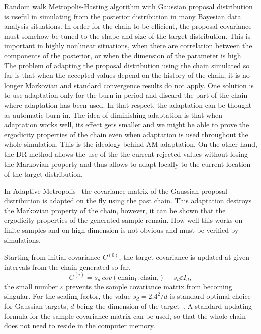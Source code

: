 Random walk Metropolis-Hasting algorithm with Gaussian proposal distribution is
useful in simulating from the posterior distribution in many Bayesian data
analysis situations.
% 
In order for the chain to be efficient, the proposal covariance must somehow be
tuned to the shape and size of the target distribution. This is important in
highly nonlinear situations, when there are correlation between the components
of the posterior, or when the dimension of the parameter is high. The problem
of adapting the proposal distribution using the chain simulated so far is that
when the accepted values depend on the history of the chain, it is no longer
Markovian and standard convergence results do not apply. One solution is to use
adaptation only for the burn-in period and discard the part of the chain where
adaptation has been used. In that respect, the adaptation can be thought as
automatic burn-in. The idea of diminishing adaptation is that when adaptation
works well, its effect gets smaller and we might be able to prove the
ergodicity properties of the chain even when adaptation is used throughout the
whole simulation. This is the ideology behind AM adaptation. On the other hand,
the DR method allows the use of the the current rejected values without losing
the Markovian property and thus allows to adapt locally to the current location
of the target distribution.

In Adaptive Metropolis~\cite{HaSaTa01} the covariance matrix of the Gaussian
proposal distribution is adapted on the fly using the past chain. This
adaptation destroys the Markovian property of the chain, however, it can be
shown that the ergodicity properties of the generated sample remain. How well
this works on finite samples and on high dimension is not obvious and must be
verified by simulations.

Starting from initial covariance $C^{(0)}$, the target covariance is updated at
given intervals from the chain generated so far.
$$
C^{(i)} = s_d \, cov(\text{chain}_1:\text{chain}_i) + s_d \varepsilon I_d,
$$
the small number $\varepsilon$ prevents the sample covariance matrix from
becoming singular. For the scaling factor, the value $s_d = 2.4^2/d$ is
standard optimal choice for Gaussian targets, $d$ being the dimension of the
target~\cite{GelmanEtAl2004}. A standard updating formula for the sample
covariance matrix can be used, so that the whole chain does not need to reside
in the computer memory.

